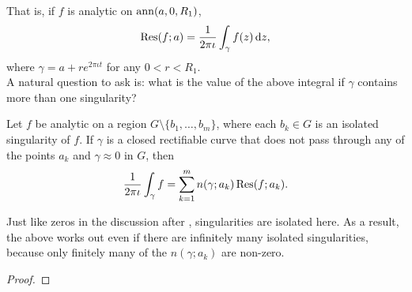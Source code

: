 	That is, if $f$ is analytic on $\operatorname{ann}(a,0,R_1)$,
	\[ \Res(f;a) = \frac{1}{2\pi\iota} \int_{\gamma} f(z) \dif z, \]
	where $\gamma = a + re^{2\pi\iota t}$ for any $0 < r < R_1$.\\
	A natural question to ask is: what is the value of the above integral if $\gamma$ contains more than one singularity?

	\begin{ftheo}
		Let $f$ be analytic on a region $G \setminus \{b_1,\ldots,b_m\}$, where each $b_k \in G$ is an isolated singularity of $f$. If $\gamma$ is a closed rectifiable curve that does not pass through any of the points $a_k$ and $\gamma \approx 0$ in $G$, then
		\[ \frac{1}{2\pi\iota} \int_{\gamma} f = \sum_{k=1}^m n(\gamma;a_k) \operatorname{Res}(f;a_k). \]
	\end{ftheo}

	Just like zeros in the discussion after , singularities are isolated here. As a result, the above works out even if there are infinitely many isolated singularities, because only finitely many of the $n(\gamma;a_k)$ are non-zero.

	\begin{proof}
		
	\end{proof}